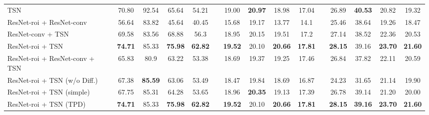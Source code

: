 \documentclass[runningheads]{llncs}
\begin{document}
\begin{table}[t]
\begin{center}
{\begin{tabular}{l|cccccccccccccc}
TSN                                                     & 70.80          & 92.54          & 65.64          & 54.21          &                      & 19.00          & \textbf{20.97} & 18.98          & 17.04          &                      & 26.89          & \textbf{40.53} & 20.82          & 19.32          \\
ResNet-roi + ResNet-conv                                    & 56.64          & 83.82          & 45.64          & 40.45          &                      & 15.68          & 19.17          & 13.77          & 14.1           &                      & 25.46          & 38.64          & 19.26          & 18.47          \\
ResNet-conv + TSN                                            & 69.58          & 83.56          & 68.88          & 56.3           &                      & 18.95          & 20.15          & 19.51          & 17.2           &                      & 27.14          & 38.52          & 22.36          & 20.53          \\
ResNet-roi + TSN                                       & \textbf{74.71} & 85.33          & \textbf{75.98} & \textbf{62.82} &                      & \textbf{19.52} & 20.10          & \textbf{20.66} & \textbf{17.81} &                      & \textbf{28.15} & 39.16          & \textbf{23.70} & \textbf{21.60} \\
ResNet-roi + ResNet-conv + TSN                              & 65.83          & 80.9           & 63.22          & 53.38          &                      & 18.69          & 19.37          & 19.25          & 17.46          &                      & 26.84          & 37.82          & 22.11          & 20.59          \\ \cline{1-5} \cline{7-10} \cline{12-15} 
ResNet-roi + TSN (w/o Diff.)                           & 67.38          & \textbf{85.59} & 63.06          & 53.49          &                      & 18.47          & 19.84          & 18.69          & 16.87          & \textbf{}            & 24.23          & 31.65          & 21.14          & 19.90          \\
ResNet-roi + TSN (simple)                              & 67.75          & 85.31          & 64.28          & 53.65          &                      & 18.96          & \textbf{20.35} & 19.13          & 17.39          &                      & 26.78          & 39.14          & 21.20          & 20.00          \\
ResNet-roi + TSN (TPD)                                      & \textbf{74.71} & 85.33          & \textbf{75.98} & \textbf{62.82} &                      & \textbf{19.52} & 20.10          & \textbf{20.66} & \textbf{17.81} &                      & \textbf{28.15} & \textbf{39.16} & \textbf{23.70} & \textbf{21.60} \\ \hline
\end{tabular}
}
\end{center}
\end{table}
\end{document}
